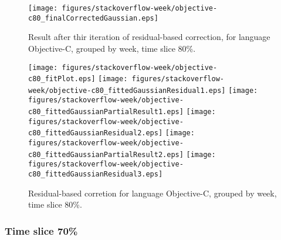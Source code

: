 \begin{figure}[]
\centering
{\texttt{[image: figures/stackoverflow-week/objective-c80\_finalCorrectedGaussian.eps]}}
\caption{Result after thir iteration of residual-based correction, for language Objective-C, grouped by week, time slice 80\%.}
\end{figure}


\begin{figure}[hb]
\centering
{}
{\texttt{[image: figures/stackoverflow-week/objective-c80\_fitPlot.eps]}}
{\texttt{[image: figures/stackoverflow-week/objective-c80\_fittedGaussianResidual1.eps]}}
{\texttt{[image: figures/stackoverflow-week/objective-c80\_fittedGaussianPartialResult1.eps]}}
{\texttt{[image: figures/stackoverflow-week/objective-c80\_fittedGaussianResidual2.eps]}}
{\texttt{[image: figures/stackoverflow-week/objective-c80\_fittedGaussianPartialResult2.eps]}}
{\texttt{[image: figures/stackoverflow-week/objective-c80\_fittedGaussianResidual3.eps]}}
\caption{Residual-based corretion for language Objective-C, grouped by week, time slice 80\%.}
\end{figure}


\clearpage 
\newpage 


\FloatBarrier

\subsubsection{Time slice 70\%}


